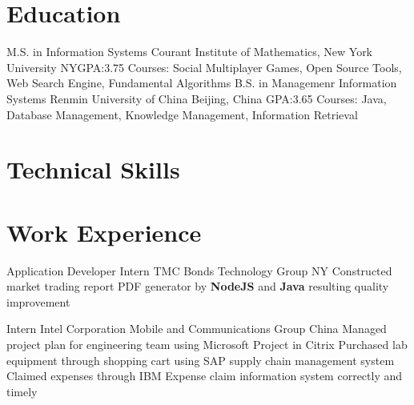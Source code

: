 \documentclass[11pt,a4paper,sans]{moderncv}   %
\begin{document}
\maketitle

\section{Education}
{M.S. in Information Systems}
{Courant Institute of Mathematics, New York University}
{NY}{GPA:3.75}
{Courses: Social Multiplayer Games, Open Source Tools, Web Search Engine, Fundamental Algorithms}
{B.S. in Managemenr Information Systems}
{Renmin University of China}
{Beijing, China}
{GPA:3.65}
{Courses: Java, Database Management, Knowledge Management, Information Retrieval}

\section{Technical Skills}


\section{Work Experience}
\renewcommand{\baselinestretch}{1.0}

{Application Developer Intern}
{TMC Bonds}
{Technology Group}
{NY}
{{Constructed market trading report PDF generator by \textbf{NodeJS} and \textbf{Java} resulting quality improvement}
}

{Intern}
{Intel Corporation}
{Mobile and Communications Group}
{China}
{{Managed project plan for engineering team using Microsoft Project in Citrix}
\newline
{Purchased lab equipment through shopping cart using SAP supply chain management system}
\newline
{Claimed expenses through IBM Expense claim information system correctly and timely}
}
\end{document}
